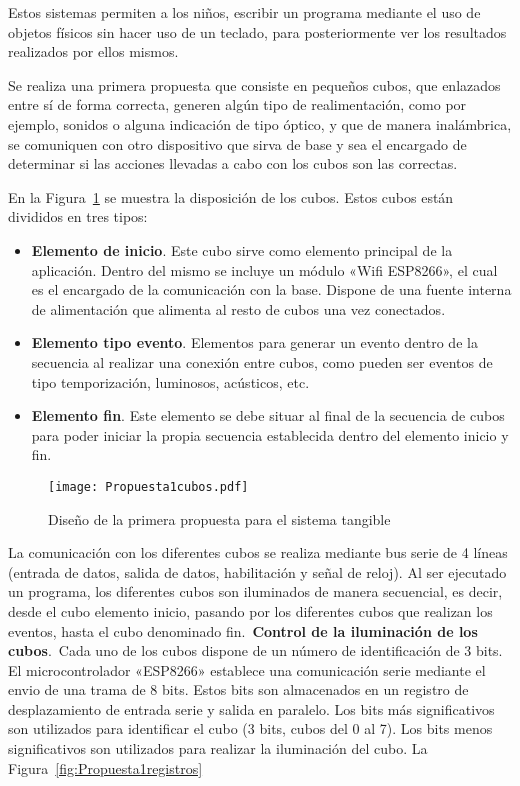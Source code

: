 Estos sistemas permiten a los niños, escribir un programa mediante el uso de objetos físicos sin hacer uso de un teclado, para posteriormente ver los resultados realizados por ellos mismos.

Se realiza una primera propuesta que consiste en pequeños cubos, que enlazados entre sí de forma correcta, generen algún tipo de realimentación, como por ejemplo, sonidos o alguna indicación de tipo óptico, y que de manera inalámbrica, se comuniquen con otro dispositivo que sirva de base y sea el encargado de determinar si las acciones llevadas a cabo con los cubos son las correctas.

En la Figura~\ref{fig:Propuesta1cubos} se muestra la disposición de los cubos. Estos cubos están divididos en tres tipos:

\begin{itemize}
\item \textbf{Elemento de inicio}. Este cubo sirve como elemento principal de la aplicación. Dentro del mismo se incluye un módulo «Wifi ESP8266», el cual es el encargado de la comunicación con la base. Dispone de una fuente interna de alimentación que alimenta al resto de cubos una vez conectados.
\item \textbf{Elemento tipo evento}. Elementos para generar un evento dentro de la secuencia al realizar una conexión entre cubos, como pueden ser eventos de tipo temporización, luminosos, acústicos, etc.
\item \textbf{Elemento fin}. Este elemento se debe situar al final de la secuencia de cubos para poder iniciar la propia secuencia establecida dentro del elemento inicio y fin. 
\end{itemize}

\begin{figure}[!h]
\begin{center}
\texttt{[image: Propuesta1cubos.pdf]}
\caption{Diseño de la primera propuesta para el sistema tangible}
\label{fig:Propuesta1cubos}
\end{center}
\end{figure}

La comunicación con los diferentes cubos se realiza mediante bus serie de 4 líneas (entrada de datos, salida de datos, habilitación y señal de reloj).
Al ser ejecutado un programa, los diferentes cubos son iluminados de manera secuencial, es decir, desde el cubo elemento inicio, pasando por los diferentes cubos que realizan los eventos, hasta el cubo denominado fin.\
\textbf{Control de la iluminación de los cubos}.\
Cada uno de los cubos dispone de un número de identificación de 3 bits. El microcontrolador «ESP8266» establece una comunicación serie mediante el envio de una trama de 8 bits. Estos bits son almacenados en un registro de desplazamiento de entrada serie y salida en paralelo. Los bits más significativos son utilizados para identificar el cubo (3 bits, cubos del 0 al 7). Los bits menos significativos son utilizados para realizar la iluminación del cubo. La Figura~\ref{fig:Propuesta1registros}

